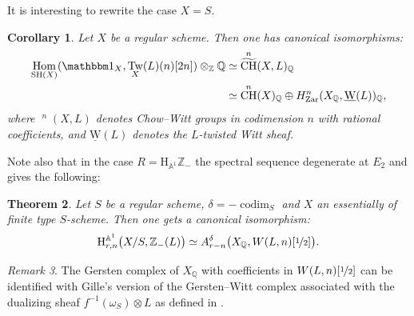 \documentclass[JEP,XML,SOM,Unicode]{cedram}
\renewcommand{\AA}{\mathbb A}
\newcommand{\un}{\mathbbm 1}
\newcommand{\uW}{\underline{\mathrm W}}
\newcommand{\HA}{\mathrm H_{\AA^1}}
\newcommand{\BA}{\mathrm H^{\AA^1}}
\DeclareMathOperator{\codim}{codim}
\DeclareMathOperator{\SH}{SH}
\DeclareMathOperator{\Hom}{Hom}
\DeclareMathOperator{\CH}{CH}
\DeclareMathOperator{\wCH}{\widetilde{CH}}
\DeclareMathOperator{\Tw}{Tw}
\newcommand{\ZZ} {\mathbb Z}
\newcommand{\ot} {{\nicefrac 1 2}}
\newcommand{\QQ} {\mathbb Q}
\newcommand{\zar}{\mathrm{Zar}}
\newtheorem{thm}{Theorem}[section]
\newtheorem{cor}[thm]{Corollary}
\theoremstyle{remark}
\newtheorem{rem}[thm]{Remark}
\theoremstyle{definition}
\numberwithin{equation}{thm}
\begin{document}
It is interesting to rewrite the case $X=S$.
\begin{cor}
Let $X$ be a regular scheme. Then one has canonical isomorphisms:
\begin{align*}
\Hom_{\SH(X)}(\un_X,\Tw_X(L)(n)[2n]) \otimes_\ZZ\QQ &\simeq \wCH^n(X,L)_\QQ \\
&\simeq \CH^n(X)_\QQ \oplus H^n_\zar(X_\QQ,\uW(L))_\QQ,
\end{align*}
where $\wCH^n(X,L)$ denotes Chow--Witt groups in codimension $n$ with rational coefficients,
and $\uW(L)$ denotes the $L$-twisted Witt sheaf.
\end{cor}

Note also that in the case $R=\HA \ZZ_-$ the spectral sequence degenerate at $E_2$
and gives the following:
\begin{thm}\label{thm:biv_A1minus&Wittcoh}
Let $S$ be a regular scheme, $\delta=-\codim_S$ and $X$ an essentially of finite type $S$-scheme.
Then one gets a canonical isomorphism:
\[
\BA_{r,n}\big(X/S,\ZZ_-(L)\big) \simeq
A^\delta_{r-n}\big(X_\QQ,W(L,n)[\ot]\big).
\]
\end{thm}

\begin{rem}
The Gersten complex of $X_\QQ$ with coefficients in $W(L,n)[\ot]$ can be identified
with Gille's version of the Gersten--Witt complex associated with the dualizing sheaf
$f^{-1}(\omega_S) \otimes L$ as defined in \cite{Gille}.
\end{rem}
\end{document}
